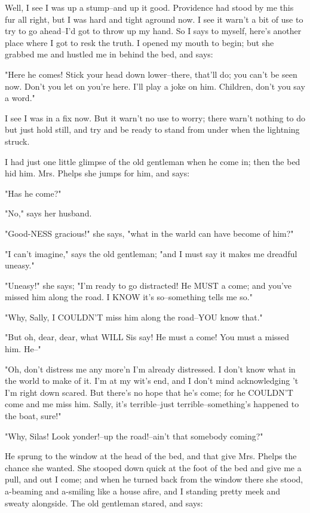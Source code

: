 Well, I see I was up a stump--and up it good.  Providence had stood by me
this fur all right, but I was hard and tight aground now.  I see it
warn't a bit of use to try to go ahead--I'd got to throw up my hand.  So
I says to myself, here's another place where I got to resk the truth.  I
opened my mouth to begin; but she grabbed me and hustled me in behind the
bed, and says:

"Here he comes!  Stick your head down lower--there, that'll do; you can't
be seen now.  Don't you let on you're here.  I'll play a joke on him.
Children, don't you say a word."

I see I was in a fix now.  But it warn't no use to worry; there warn't
nothing to do but just hold still, and try and be ready to stand from
under when the lightning struck.

I had just one little glimpse of the old gentleman when he come in; then
the bed hid him.  Mrs. Phelps she jumps for him, and says:

"Has he come?"

"No," says her husband.

"Good-NESS gracious!" she says, "what in the warld can have become of
him?"

"I can't imagine," says the old gentleman; "and I must say it makes me
dreadful uneasy."

"Uneasy!" she says; "I'm ready to go distracted!  He MUST a come; and
you've missed him along the road.  I KNOW it's so--something tells me
so."

"Why, Sally, I COULDN'T miss him along the road--YOU know that."

"But oh, dear, dear, what WILL Sis say!  He must a come!  You must a
missed him.  He--"

"Oh, don't distress me any more'n I'm already distressed.  I don't know
what in the world to make of it.  I'm at my wit's end, and I don't mind
acknowledging 't I'm right down scared.  But there's no hope that he's
come; for he COULDN'T come and me miss him.  Sally, it's terrible--just
terrible--something's happened to the boat, sure!"

"Why, Silas!  Look yonder!--up the road!--ain't that somebody coming?"

He sprung to the window at the head of the bed, and that give Mrs. Phelps
the chance she wanted.  She stooped down quick at the foot of the bed and
give me a pull, and out I come; and when he turned back from the window
there she stood, a-beaming and a-smiling like a house afire, and I
standing pretty meek and sweaty alongside.  The old gentleman stared, and
says:

